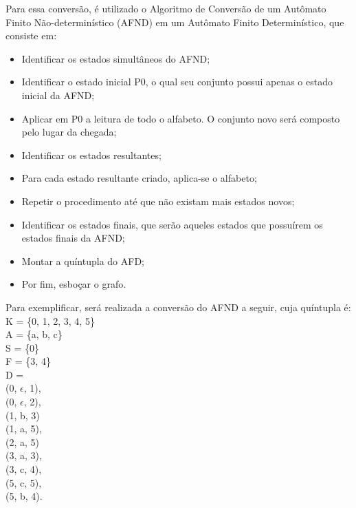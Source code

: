 \documentclass[a4paper,10pt]{article} %
\begin{document}
Para essa conversão, é utilizado o Algoritmo de Conversão de um Autômato Finito Não-determinístico (AFND) em um Autômato Finito Determinístico, que consiste em:
    \begin{itemize}
        \item Identificar os estados simultâneos do AFND;
        \item Identificar o estado inicial P0, o qual seu conjunto possui apenas o estado inicial da AFND;
        \item Aplicar em P0 a leitura de todo o alfabeto. O conjunto novo será composto pelo lugar da chegada;
        \item Identificar os estados resultantes;
        \item Para cada estado resultante criado, aplica-se o alfabeto;
        \item Repetir o procedimento até que não existam mais estados novos;
        \item Identificar os estados finais, que serão aqueles estados que possuírem os estados finais da AFND;     
        \item Montar a quíntupla do AFD;     
        \item Por fim, esboçar o grafo.    
    \end{itemize}

Para exemplificar, será realizada a conversão do AFND a seguir, cuja quíntupla é:\\K = \{0, 1, 2, 3, 4, 5\}\\A = \{a, b, c\}\\S = \{0\}\\F = \{3, 4\}\\D =\\(0, {$\epsilon$}, 1),\\(0, {$\epsilon$}, 2),\\(1, b, 3)\\(1, a, 5),\\(2, a, 5)\\(3, a, 3),\\(3, c, 4),\\(5, c, 5),\\(5, b, 4). \\
    \begin{center}
    \end{center}
\end{document}

